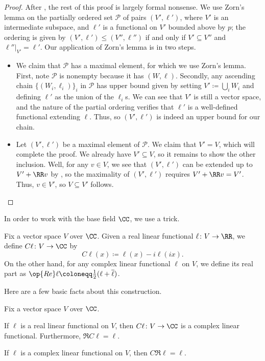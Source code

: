 \documentclass[notes.tex]{subfiles}
\begin{document}
\begin{proof}
	After , the rest of this proof is largely formal nonsense. We use Zorn's lemma on the partially ordered set $\mathcal P$ of pairs $(V',\ell')$, where $V'$ is an intermediate subspace, and $\ell'$ is a functional on $V'$ bounded above by $p$; the ordering is given by $(V',\ell')\le(V'',\ell'')$ if and only if $V'\subseteq V''$ and $\ell''|_{V'}=\ell'$. Our application of Zorn's lemma is in two steps.
	\begin{itemize}
		\item We claim that $\mathcal P$ has a maximal element, for which we use Zorn's lemma. First, note $\mathcal P$ is nonempty because it has $(W,\ell)$. Secondly, any ascending chain $\{(W_i,\ell_i)\}_i$ in $\mathcal P$ has upper bound given by setting $V'\coloneqq\bigcup_iW_i$ and defining $\ell'$ as the union of the $\ell_i$s. We can see that $V'$ is still a vector space, and the nature of the partial ordering verifies that $\ell'$ is a well-defined functional extending $\ell$. Thus, so $(V',\ell')$ is indeed an upper bound for our chain.
		\item Let $(V',\ell')$ be a maximal element of $\mathcal P$. We claim that $V'=V$, which will complete the proof. We already have $V'\subseteq V$, so it remains to show the other inclusion. Well, for any $v\in V$, we see that $(V',\ell')$ can be extended up to $V'+\RR v$ by , so the maximality of $(V',\ell')$ requires $V'+\RR v=V'$. Thus, $v\in V'$, so $V\subseteq V'$ follows.
		\qedhere
	\end{itemize}
\end{proof}
In order to work with the base field $\CC$, we use a trick.
\begin{notation}
	Fix a vector space $V$ over $\CC$. Given a real linear functional $\ell\colon V\to\RR$, we define $C\ell\colon V\to\CC$ by
	\[C\ell(x)\coloneqq\ell(x)-i\ell(ix).\]
	On the other hand, for any complex linear functional $\ell$ on $V$, we define its real part as $\op{Re}\ell\coloneqq\frac12(\ell+\overline\ell)$.
\end{notation}
Here are a few basic facts about this construction.
\begin{lemma} \label{lem:use-complexification}
	Fix a vector space $V$ over $\CC$.
	\begin{listalph}
		\item If $\ell$ is a real linear functional on $V$, then $C\ell\colon V\to\CC$ is a complex linear functional. Furthermore, $\Re C\ell=\ell$.
		\item If $\ell$ is a complex linear functional on $V$, then $C\Re\ell=\ell$.
	\end{listalph}
\end{lemma}
\end{document}
